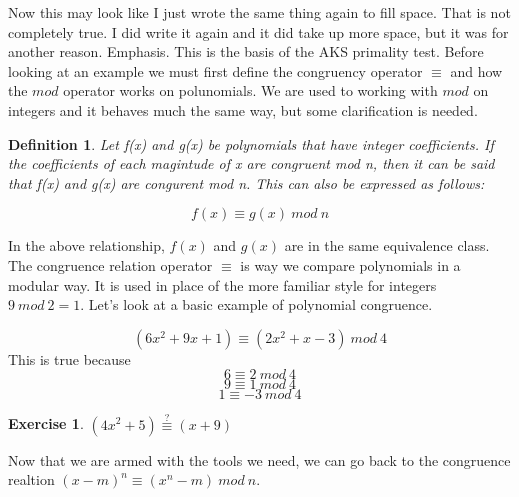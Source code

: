 \documentclass[11pt]{article}
\newtheorem{ex}{Exercise}
\newtheorem{definition}{Definition}
\begin{document}
Now this may look like I just wrote the same thing again to fill space. That is not completely true. I did write it again and it did take up more space, but it was for another reason. Emphasis. This is the basis of the AKS primality test. Before looking at an example we must first define the congruency operator $\equiv$ and how the $mod$ operator works on polunomials. We are used to working with $mod$ on integers and it behaves much the same way, but some clarification is needed. 


\begin{definition}
Let f(x) and g(x) be polynomials  that have integer coefficients. If the coefficients of each magintude of x are congruent mod n, then it can be said that f(x) and g(x) are congurent mod n. This can also be expressed as follows:

$$f(x) \equiv g(x)\ mod\ n$$
 
\end{definition}

In the above relationship, $f(x)$ and $g(x)$ are in the same equivalence class. The congruence relation operator $\equiv$ is way we compare polynomials in a modular way. It is used in place of the more familiar style for integers $ 9\ mod\ 2 = 1 $. Let's look at a basic example of polynomial congruence.

$$(6x^2+9x+1) \equiv (2x^2+x-3)\ mod\ 4$$ This is true because
$$ 6 \equiv 2\ mod\ 4 $$
$$ 9 \equiv 1\ mod\ 4 $$
$$ 1 \equiv -3\ mod\ 4 $$
\begin{ex}
$(4x^2+5) \stackrel{?}{\equiv} (x+9)$
\end{ex}
\vspace{10pc}
Now that we are armed with the tools we need, we can go back to the congruence realtion $(x-m)^n \equiv (x^n -m)\ mod\ n$.
\end{document}
